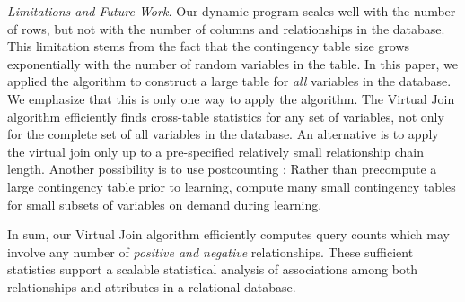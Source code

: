 \documentclass{acm_proc_article-sp}
\begin{document}


\emph{Limitations and Future Work.} 
Our dynamic program scales well with the number of rows, but not with the number of columns and relationships in the database. 
This limitation stems from the fact that the contingency table size grows exponentially with the number of random variables in the table. In this paper, we applied the algorithm to construct a large table for {\em all} variables in the database. We emphasize that this is only one way to apply the algorithm. The Virtual Join algorithm efficiently finds cross-table statistics for any set of variables, not only for the complete set of all variables in the database. An alternative is to apply the virtual join only up to a pre-specified relatively small relationship chain length.
Another possibility is to use postcounting \cite{lv2012}: Rather than precompute a large contingency table prior to learning, compute many small contingency tables for  small subsets of variables on demand during learning. 
%
%


In sum, our Virtual Join algorithm efficiently computes query counts which may involve any number of {\em positive and negative }relationships. %
These sufficient statistics support a scalable statistical analysis of  associations among both relationships and attributes in a relational database.
\end{document}
